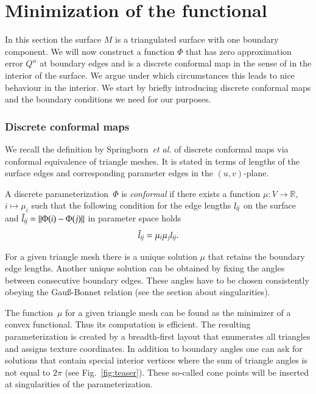 \documentclass[Thesis.tex]{subfiles}
\begin{document}
\section{Minimization of the functional}
\label{sec:algorithm}

In this section the surface $M$ is a triangulated surface with one boundary
component. We will now construct a function $\Phi$ that
has zero approximation error $Q^\alpha$ at boundary edges and is a discrete
conformal map in the sense of \cite{Springborn2008} in the interior of the
surface. We argue under which circumstances this leads to nice
behaviour in the interior. We start by briefly introducing discrete conformal
maps and the boundary conditions we need for our purposes.

\subsubsection{Discrete conformal maps}
\label{subsub:discrete_conformal_maps}

We recall the definition by Springborn~\emph{et al.} of discrete conformal 
maps via conformal equivalence of triangle meshes. It is stated in terms of
lengths of the surface edges and corresponding parameter edges in the 
$(u,v)$-plane.
\begin{definition} 
  A discrete parameterization~$\Phi$ is \emph{conformal} if there exists a
function $\mu:V \to \mathbb{R}$, $i \mapsto \mu_i$ such that the following
condition for the edge lengths $l_{\mathrm{\it{ij}}}$ on the surface and
$\tilde{l}_{\mathrm{\it{ij}}}=\Vert\Phi(i)-\Phi(j)\Vert$ in parameter space holds
\begin{eqnarray}
  \label{eq:discrete_conformal} 
  \tilde{l}_{\mathrm{\it{ij}}}=\mu_i\mu_j l_{\mathrm{\it{ij}}}.
\end{eqnarray}
\end{definition}
For a given triangle mesh there is a unique solution $\mu$ that retains the 
boundary edge lengths. Another unique solution can be obtained by fixing 
the angles between consecutive boundary edges. These angles have to be 
chosen consistently obeying the Gau\ss-Bonnet relation 
(see the section about singularities).

The function~$\mu$ for a given triangle mesh can be found as the minimizer 
of a convex functional. Thus its computation is efficient. The resulting 
parameterization is created by a breadth-first layout that enumerates 
all triangles and assigns texture coordinates. In addition to boundary angles 
one can ask for solutions that contain special interior vertices where the
 sum of triangle angles is not equal to $2\pi$ (see Fig.~\ref{fig:teaser}). 
These so-called cone points will be inserted at singularities of the 
parameterization.
\end{document}

